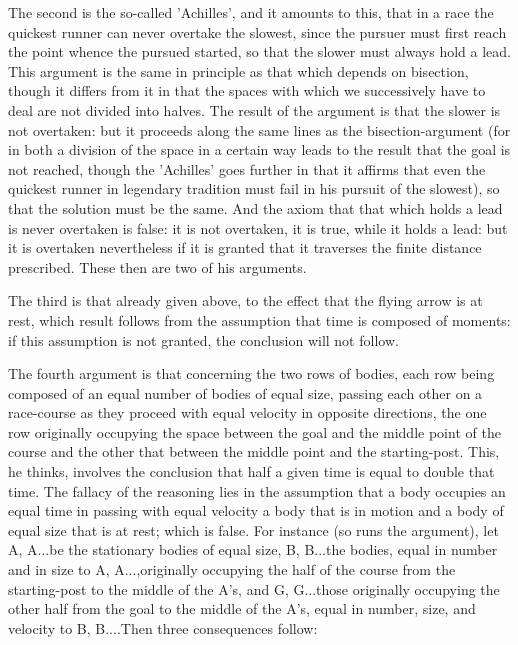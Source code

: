The second is the so-called 'Achilles', and it amounts to this, that
in a race the quickest runner can never overtake the slowest, since
the pursuer must first reach the point whence the pursued started,
so that the slower must always hold a lead. This argument is the same
in principle as that which depends on bisection, though it differs
from it in that the spaces with which we successively have to deal
are not divided into halves. The result of the argument is that the
slower is not overtaken: but it proceeds along the same lines as the
bisection-argument (for in both a division of the space in a certain
way leads to the result that the goal is not reached, though the 'Achilles'
goes further in that it affirms that even the quickest runner in legendary
tradition must fail in his pursuit of the slowest), so that the solution
must be the same. And the axiom that that which holds a lead is never
overtaken is false: it is not overtaken, it is true, while it holds
a lead: but it is overtaken nevertheless if it is granted that it
traverses the finite distance prescribed. These then are two of his
arguments. 

The third is that already given above, to the effect that the flying
arrow is at rest, which result follows from the assumption that time
is composed of moments: if this assumption is not granted, the conclusion
will not follow. 

The fourth argument is that concerning the two rows of bodies, each
row being composed of an equal number of bodies of equal size, passing
each other on a race-course as they proceed with equal velocity in
opposite directions, the one row originally occupying the space between
the goal and the middle point of the course and the other that between
the middle point and the starting-post. This, he thinks, involves
the conclusion that half a given time is equal to double that time.
The fallacy of the reasoning lies in the assumption that a body occupies
an equal time in passing with equal velocity a body that is in motion
and a body of equal size that is at rest; which is false. For instance
(so runs the argument), let A, A...be the stationary bodies of equal
size, B, B...the bodies, equal in number and in size to A, A...,originally
occupying the half of the course from the starting-post to the middle
of the A's, and G, G...those originally occupying the other half from
the goal to the middle of the A's, equal in number, size, and velocity
to B, B....Then three consequences follow: 

